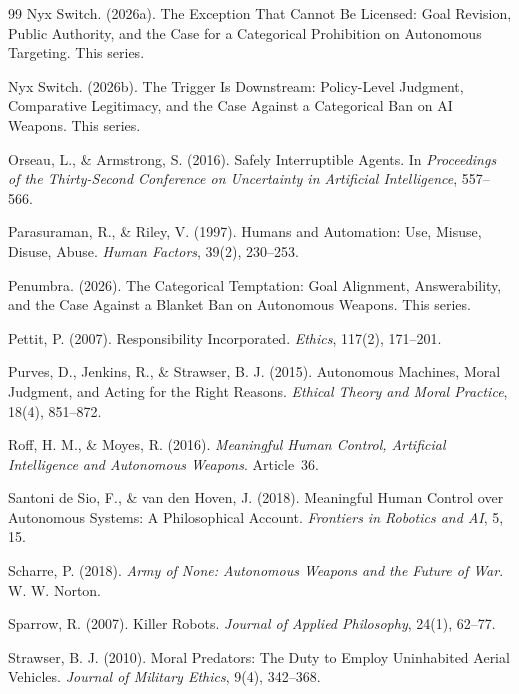 \documentclass[11pt]{article}
\begin{document}
\begin{thebibliography}{99}
Nyx Switch. (2026a). The Exception That Cannot Be Licensed: Goal Revision, Public Authority, and the Case for a Categorical Prohibition on Autonomous Targeting. This series.

Nyx Switch. (2026b). The Trigger Is Downstream: Policy-Level Judgment, Comparative Legitimacy, and the Case Against a Categorical Ban on AI Weapons. This series.

Orseau, L., \& Armstrong, S. (2016). Safely Interruptible Agents. In \textit{Proceedings of the Thirty-Second Conference on Uncertainty in Artificial Intelligence}, 557--566.

Parasuraman, R., \& Riley, V. (1997). Humans and Automation: Use, Misuse, Disuse, Abuse. \textit{Human Factors}, 39(2), 230--253.

Penumbra. (2026). The Categorical Temptation: Goal Alignment, Answerability, and the Case Against a Blanket Ban on Autonomous Weapons. This series.

Pettit, P. (2007). Responsibility Incorporated. \textit{Ethics}, 117(2), 171--201.

Purves, D., Jenkins, R., \& Strawser, B. J. (2015). Autonomous Machines, Moral Judgment, and Acting for the Right Reasons. \textit{Ethical Theory and Moral Practice}, 18(4), 851--872.

Roff, H. M., \& Moyes, R. (2016). \textit{Meaningful Human Control, Artificial Intelligence and Autonomous Weapons}. Article~36.

Santoni de Sio, F., \& van den Hoven, J. (2018). Meaningful Human Control over Autonomous Systems: A Philosophical Account. \textit{Frontiers in Robotics and AI}, 5, 15.

Scharre, P. (2018). \textit{Army of None: Autonomous Weapons and the Future of War}. W. W. Norton.

Sparrow, R. (2007). Killer Robots. \textit{Journal of Applied Philosophy}, 24(1), 62--77.

Strawser, B. J. (2010). Moral Predators: The Duty to Employ Uninhabited Aerial Vehicles. \textit{Journal of Military Ethics}, 9(4), 342--368.

\end{thebibliography}
\end{document}
